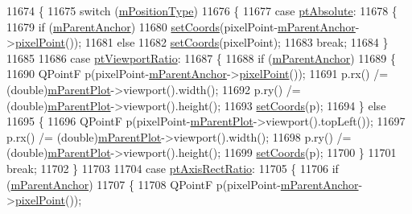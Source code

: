 \begin{DoxyCode}
11674 \{
11675   \textcolor{keywordflow}{switch} (\hyperlink{a00038_ac9c7bbca809601323d3ae2542ef2801a}{mPositionType})
11676   \{
11677     \textcolor{keywordflow}{case} \hyperlink{a00038_aad9936c22bf43e3d358552f6e86dbdc8a564f5e53e550ead1ec5fc7fc7d0b73e0}{ptAbsolute}:
11678     \{
11679       \textcolor{keywordflow}{if} (\hyperlink{a00038_a21e37c5a8cabe747a2c60773b23eddeb}{mParentAnchor})
11680         \hyperlink{a00038_aa988ba4e87ab684c9021017dcaba945f}{setCoords}(pixelPoint-\hyperlink{a00038_a21e37c5a8cabe747a2c60773b23eddeb}{mParentAnchor}->\hyperlink{a00032_ae92def8f9297c5d73f5806c586517bb3}{pixelPoint}());
11681       \textcolor{keywordflow}{else}
11682         \hyperlink{a00038_aa988ba4e87ab684c9021017dcaba945f}{setCoords}(pixelPoint);
11683       \textcolor{keywordflow}{break};
11684     \}
11685       
11686     \textcolor{keywordflow}{case} \hyperlink{a00038_aad9936c22bf43e3d358552f6e86dbdc8ac7d6aa89ceacb39658b0d6da061c789a}{ptViewportRatio}:
11687     \{
11688       \textcolor{keywordflow}{if} (\hyperlink{a00038_a21e37c5a8cabe747a2c60773b23eddeb}{mParentAnchor})
11689       \{
11690         QPointF p(pixelPoint-\hyperlink{a00038_a21e37c5a8cabe747a2c60773b23eddeb}{mParentAnchor}->\hyperlink{a00032_ae92def8f9297c5d73f5806c586517bb3}{pixelPoint}());
11691         p.rx() /= (double)\hyperlink{a00032_a59b968410831ba91a25cc75a77dde6f5}{mParentPlot}->viewport().width();
11692         p.ry() /= (double)\hyperlink{a00032_a59b968410831ba91a25cc75a77dde6f5}{mParentPlot}->viewport().height();
11693         \hyperlink{a00038_aa988ba4e87ab684c9021017dcaba945f}{setCoords}(p);
11694       \} \textcolor{keywordflow}{else}
11695       \{
11696         QPointF p(pixelPoint-\hyperlink{a00032_a59b968410831ba91a25cc75a77dde6f5}{mParentPlot}->viewport().topLeft());
11697         p.rx() /= (double)\hyperlink{a00032_a59b968410831ba91a25cc75a77dde6f5}{mParentPlot}->viewport().width();
11698         p.ry() /= (double)\hyperlink{a00032_a59b968410831ba91a25cc75a77dde6f5}{mParentPlot}->viewport().height();
11699         \hyperlink{a00038_aa988ba4e87ab684c9021017dcaba945f}{setCoords}(p);
11700       \}
11701       \textcolor{keywordflow}{break};
11702     \}
11703       
11704     \textcolor{keywordflow}{case} \hyperlink{a00038_aad9936c22bf43e3d358552f6e86dbdc8a01080fd00eaf09fa238ef6b73bbfef75}{ptAxisRectRatio}:
11705     \{
11706       \textcolor{keywordflow}{if} (\hyperlink{a00038_a21e37c5a8cabe747a2c60773b23eddeb}{mParentAnchor})
11707       \{
11708         QPointF p(pixelPoint-\hyperlink{a00038_a21e37c5a8cabe747a2c60773b23eddeb}{mParentAnchor}->\hyperlink{a00032_ae92def8f9297c5d73f5806c586517bb3}{pixelPoint}());

\end{DoxyCode}
